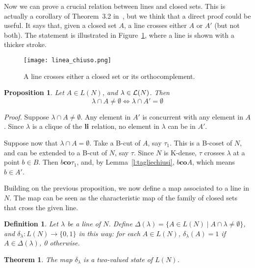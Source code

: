 \documentclass{eptcs}
\newcommand{\co}{\mathrel{\mathbf{co}}}
\newenvironment{proof}{\textit{Proof.}\quad}{\par\vspace{\baselineskip}\relax}
\newtheorem{definition}{Definition}
\newtheorem{proposition}{Proposition}
\newtheorem{theorem}{Theorem}
\begin{document}
Now we can prove a crucial relation between lines and closed sets.
This is actually a corollary of Theorem~3.2 in~\cite{BPR10}, but
we think that a direct proof could be useful. It says that, given
a closed set $A$, a line crosses either $A$ or $A'$ (but not both).
The statement is illustrated in Figure~\ref{f:linea_chiuso}, where
a line is shown with a thicker stroke.
\begin{figure}
  \begin{center}
\texttt{[image: linea\_chiuso.png]}
  \end{center}
  \caption{A line crosses either a closed set or its orthocomplement.}\label{f:linea_chiuso}
\end{figure}
\begin{proposition}\label{p:lmeetsc}
  Let $A \in L(N)$, and $\lambda \in \mathcal{L}(N)$.
  Then
  \[
      \lambda \cap A \not= \emptyset
              \Leftrightarrow
      \lambda \cap A' = \emptyset
  \]
\end{proposition}
\begin{proof}
  Suppose $\lambda \cap A \not= \emptyset$. Any element in $A'$ is
  concurrent with any element in $A$. Since $\lambda$ is a clique
  of the $\mathrel{\mathbf{li}}$ relation, no element in $\lambda$ can be in $A'$.

  Suppose now that $\lambda \cap A = \emptyset$. Take a B-cut of $A$,
  say $\tau_1$. This is a B-coset of $N$, and can be extended to a
  B-cut of $N$, say $\tau$. Since $N$ is K-dense, $\tau$ crosses
  $\lambda$ at a point $b \in B$. Then $b \co \tau_1$, and,
  by Lemma~\ref{l:tagliechiusi}, $b \co A$, which means $b \in A'$.
\end{proof}
Building on the previous proposition, we now define a map associated to
a line in $N$. The map can be seen as the characteristic map of
the family of closed sets that cross the given line.
\begin{definition}
  Let $\lambda$ be a line of $N$. Define
  $\Delta(\lambda) = \{ A \in L(N) \mid A \cap \lambda \not= \emptyset \}$,
  and $\delta_{\lambda}: L(N) \rightarrow \{0, 1 \}$ in this way:
  for each $A \in L(N)$, $\delta_{\lambda}(A) = 1$ if
  $A \in \Delta(\lambda)$, 0 otherwise.
\end{definition}
\begin{theorem}\label{t:line_2vs}
  The map $\delta_{\lambda}$ is a two-valued state of $L(N)$.
\end{theorem}
\end{document}
